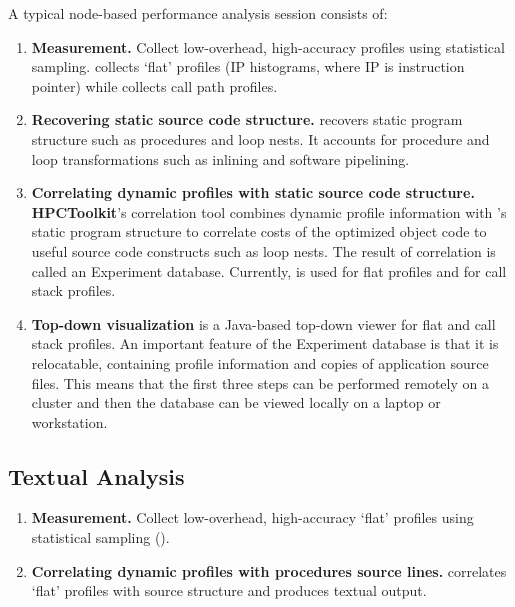 \documentclass[english]{article}
\begin{document}
A typical node-based performance analysis session consists of:
\begin{enumerate}
\item \textbf{Measurement.}  
Collect low-overhead, high-accuracy profiles using statistical sampling.
 collects `flat' profiles (IP histograms, where IP is instruction pointer) while  collects call path profiles.

\item \textbf{Recovering static source code structure.} 
 recovers static program structure such as procedures and loop nests.
It accounts for procedure and loop transformations such as inlining and software pipelining.

\item \textbf{Correlating dynamic profiles with static source code structure.} 
\textbf{HPCToolkit}'s correlation tool combines dynamic profile information with 's static program structure to correlate costs of the optimized object code to useful source code constructs such as loop nests.
The result of correlation is called an Experiment database.
Currently,  is used for flat profiles and  for call stack profiles.

\item \textbf{Top-down visualization}
 is a Java-based top-down viewer for flat and call stack profiles.
An important feature of the Experiment database is that it is relocatable, containing profile information and copies of application source files.
This means that the first three steps can be performed remotely on a cluster and then the database can be viewed locally on a laptop or workstation.
\end{enumerate}

\subsection{Textual Analysis}

\begin{enumerate}
\item \textbf{Measurement.}  
Collect low-overhead, high-accuracy `flat' profiles using statistical sampling ().

\item \textbf{Correlating dynamic profiles with procedures source lines.} 
 correlates `flat' profiles with source structure and produces textual output.

\end{enumerate}
\end{document}
